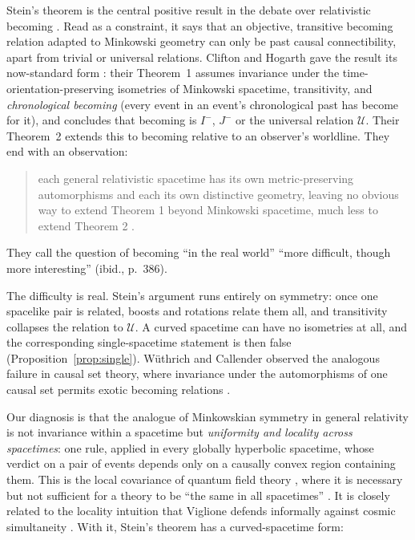 \documentclass[11pt]{article}
\theoremstyle{definition}
\newcommand{\U}{\mathcal U}
\newcommand{\Ichr}{I^{-}}
\newcommand{\Jm}{J^{-}}
\begin{document}
Stein's theorem is the central positive result in the debate over
relativistic becoming \citep{Stein1968,Stein1991}. Read as a constraint, it
says that an objective, transitive becoming relation adapted to Minkowski
geometry can only be past causal connectibility, apart from trivial or
universal relations. Clifton and Hogarth gave the result its now-standard form
\citep{CH1995}: their Theorem~1 assumes invariance under the
time-orientation-preserving isometries of Minkowski spacetime, transitivity,
and \emph{chronological becoming} (every event in an event's chronological
past has become for it), and concludes that becoming is $\Ichr$, $\Jm$ or the
universal relation $\U$. Their Theorem~2 extends this to becoming relative to
an observer's worldline. They end with an observation:
\begin{quote}
each general relativistic spacetime has its own metric-preserving
automorphisms and each its own distinctive geometry, leaving no obvious way
to extend Theorem 1 beyond Minkowski spacetime, much less to extend Theorem 2
\citep[p.~385]{CH1995}.
\end{quote}
They call the question of becoming ``in the real world'' ``more difficult,
though more interesting'' (ibid., p.~386).

The difficulty is real. Stein's argument runs entirely on symmetry: once one
spacelike pair is related, boosts and rotations relate them all, and
transitivity collapses the relation to $\U$. A curved spacetime can have
no isometries at all, and the corresponding single-spacetime statement is
then false (Proposition~\ref{prop:single}). Wüthrich and Callender observed
the analogous failure in causal set theory, where invariance under the
automorphisms of one causal set permits exotic becoming relations
\citep{WC2017}.

Our diagnosis is that the analogue of Minkowskian symmetry in general
relativity is not invariance within a spacetime but \emph{uniformity and
locality across spacetimes}: one rule, applied in every globally hyperbolic
spacetime, whose verdict on a pair of events depends only on a causally
convex region containing them. This is the local covariance of quantum
field theory \citep{BFV2003}, where it is necessary but not sufficient for a
theory to be ``the same in all spacetimes'' \citep{FV2012}. It is closely
related to the locality intuition that Viglione defends informally against
cosmic simultaneity \citep{Viglione2026}. With it, Stein's theorem has a curved-spacetime form:
\end{document}
